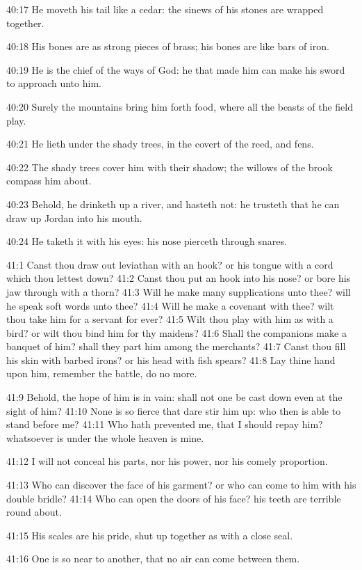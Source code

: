 40:17 He moveth his tail like a cedar: the sinews of his stones are wrapped together.

40:18 His bones are as strong pieces of brass; his bones are like bars of iron.

40:19 He is the chief of the ways of God: he that made him can make his sword to approach unto him.

40:20 Surely the mountains bring him forth food, where all the beasts of the field play.

40:21 He lieth under the shady trees, in the covert of the reed, and fens.

40:22 The shady trees cover him with their shadow; the willows of the brook compass him about.

40:23 Behold, he drinketh up a river, and hasteth not: he trusteth that he can draw up Jordan into his mouth.

40:24 He taketh it with his eyes: his nose pierceth through snares.

41:1 Canst thou draw out leviathan with an hook? or his tongue with a cord which thou lettest down?  41:2 Canst thou put an hook into his nose? or bore his jaw through with a thorn?  41:3 Will he make many supplications unto thee? will he speak soft words unto thee?  41:4 Will he make a covenant with thee? wilt thou take him for a servant for ever?  41:5 Wilt thou play with him as with a bird? or wilt thou bind him for thy maidens?  41:6 Shall the companions make a banquet of him? shall they part him among the merchants?  41:7 Canst thou fill his skin with barbed irons? or his head with fish spears?  41:8 Lay thine hand upon him, remember the battle, do no more.

41:9 Behold, the hope of him is in vain: shall not one be cast down even at the sight of him?  41:10 None is so fierce that dare stir him up: who then is able to stand before me?  41:11 Who hath prevented me, that I should repay him? whatsoever is under the whole heaven is mine.

41:12 I will not conceal his parts, nor his power, nor his comely proportion.

41:13 Who can discover the face of his garment? or who can come to him with his double bridle?  41:14 Who can open the doors of his face? his teeth are terrible round about.

41:15 His scales are his pride, shut up together as with a close seal.

41:16 One is so near to another, that no air can come between them.

